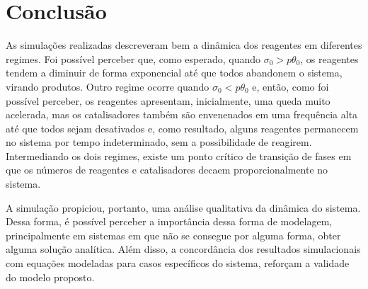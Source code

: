 
\section{Conclusão}

As simulações realizadas descreveram bem a dinâmica dos reagentes em diferentes
regimes. Foi possível perceber que, como esperado, quando
$\sigma_0 > p \theta_0$, os reagentes tendem a diminuir de forma exponencial até
que todos abandonem o sistema, virando produtos. Outro regime ocorre quando
$\sigma_0 < p \theta_0$ e, então, como foi possível perceber, os reagentes
apresentam, inicialmente, uma queda muito acelerada, mas os catalisadores também
são envenenados em uma frequência alta até que todos sejam desativados e, como
resultado, alguns reagentes permanecem no sistema por tempo indeterminado, sem a
possibilidade de reagirem. Intermediando os dois regimes, existe um ponto
crítico de transição de fases em que os números de reagentes e catalisadores
decaem proporcionalmente no sistema.

A simulação propiciou, portanto, uma análise qualitativa da dinâmica do sistema.
Dessa forma, é possível perceber a importância dessa forma de modelagem,
principalmente em sistemas em que não se consegue por alguma forma, obter alguma
solução analítica. Além disso, a concordância dos resultados simulacionais com
equações modeladas para casos específicos do sistema, reforçam a validade do
modelo proposto.
